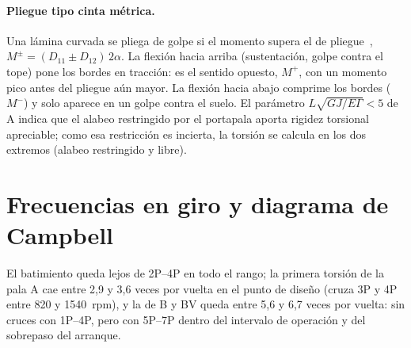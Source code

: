\paragraph{Pliegue tipo cinta métrica.} Una lámina curvada se pliega de golpe si el
momento supera el de pliegue~\cite{estructura-seffen1999},
$M^\pm=(D_{11}\pm D_{12})\,2\alpha$. La flexión hacia arriba (sustentación, golpe contra
el tope) pone los bordes en tracción: es el sentido opuesto, $M^+$, con un momento pico
antes del pliegue aún mayor. La flexión hacia abajo comprime los bordes ($M^-$) y solo
aparece en un golpe contra el suelo. El parámetro $L\sqrt{GJ/E\Gamma}<5$ de A indica que
el alabeo restringido por el portapala aporta rigidez torsional apreciable; como esa
restricción es incierta, la torsión se calcula en los dos extremos (alabeo restringido y
libre).

\section{Frecuencias en giro y diagrama de Campbell}\label{sec:estructura-campbell}

El batimiento queda lejos de 2P--4P en todo el rango; la primera torsión de la pala A cae
entre 2,9 y 3,6 veces por vuelta en el punto de diseño (cruza 3P y 4P entre \num{820} y
\SI{1540}{rpm}), y la de B y BV queda entre 5,6 y 6,7 veces por vuelta: sin cruces con
1P--4P, pero con 5P--7P dentro del intervalo de operación y del sobrepaso del arranque.

